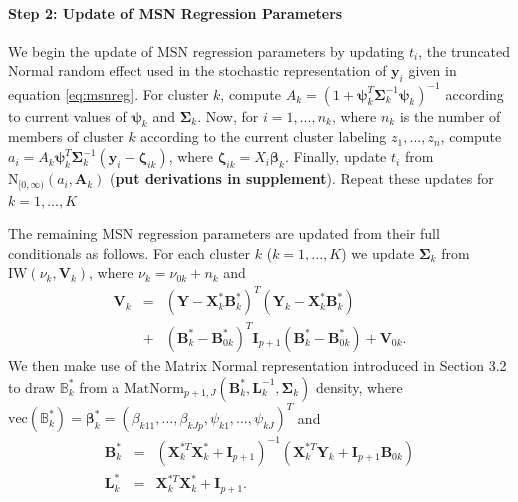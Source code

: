 \documentclass[useAMS,referee]{biom}
\begin{document}
\paragraph{\textbf{Step 2:} Update of MSN Regression Parameters} We begin the update of MSN regression parameters by updating $t_i$, the truncated Normal random effect used in the stochastic representation of $\mathbf{y}_i$ given in equation \ref{eq:msnreg}. For cluster $k$, compute $A_k = (1 + \boldsymbol\psi_k^T \boldsymbol\Sigma^{-1}_k\boldsymbol
\psi_k)^{-1}$ according to current values of $\boldsymbol\psi_k$ and $\boldsymbol\Sigma_k$. Now, for $i = 1,...,n_k$, where $n_k$ is the number of members of cluster $k$ according to the current cluster labeling ${z}_1,...,{z}_n$, compute $a_i = A_k \boldsymbol\psi_k^T \boldsymbol\Sigma^{-1}_k(\mathbf{y}_i - \boldsymbol\zeta_{ik})$, where $\boldsymbol\zeta_{ik} = X_i \boldsymbol\beta_k$. Finally, update $t_i$ from $\text{N}_{[0,\infty)}(a_i, \mathbf{A}_k)$ (\textbf{put derivations in supplement}).  Repeat these updates for $k = 1,...,K$

The remaining MSN regression parameters are updated from their full conditionals as follows. For each cluster $k$ ($k = 1,...,K$) we update $\boldsymbol\Sigma_k$ from $\text{IW}(\nu_k,\mathbf{V}_k)$, where $\nu_k = \nu_{0k} + n_k$ and\begin{eqnarray}
	\mathbf{V}_k &=&  (\mathbf{Y}-\mathbf{X}^*_k \mathbf{B}^*_k)^T (\mathbf{Y}_k - \mathbf{X}^*_k \mathbf{B}^*_k)\nonumber \\
	 &+& (\mathbf{B}_k^* - \mathbf{B}^*_{0k})^T \mathbf{I}_{p+1}(\mathbf{B}^*_k - \mathbf{B}^*_{0k}) + \mathbf{V}_{0k}. \nonumber
\end{eqnarray}We then make use of the Matrix Normal representation introduced in Section 3.2 to draw $\mathbb{B}^*_k$ from a $\text{MatNorm}_{p+1,J}(\mathbf{B}_k^*,\mathbf{L}_k^{-1},\boldsymbol\Sigma_k)$ density, where $\text{vec}(\mathbb{B}^*_k) = \boldsymbol\beta^*_k = (\beta_{k11},...,\beta_{kJp},\psi_{k1},...,\psi_{kJ})^T$ and
\begin{eqnarray}
	\mathbf{B}^*_k &=& (\mathbf{X}^{*T}_k \mathbf{X}^*_k + \mathbf{I}_{p+1})^{-1} (\mathbf{X}^{*T}_k \mathbf{Y}_k + \mathbf{I}_{p+1} \mathbf{B}_{0k}) \nonumber \\
	\mathbf{L}^*_k &=& \mathbf{X}^{*T}_k \mathbf{X}^*_k + \mathbf{I}_{p+1}. \nonumber
\end{eqnarray}
\end{document}
